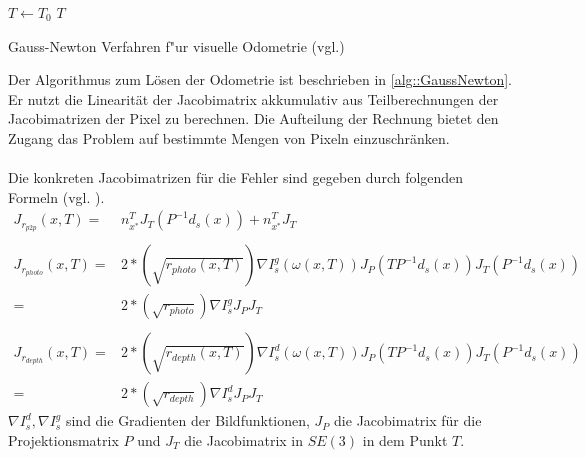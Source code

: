 \documentclass[12pt,DIV=15,BCOR=15mm,twoside,headsepline,abstract=true,listof=totoc,bibliography=totoc]{scrreprt}
\theoremstyle{remark}    %
\begin{document}
    \begin{algorithm}[t]
        \SetAlgoLined
        $T \gets T_0$\;
        \Return $T$\;
        \caption{Gauss-Newton Verfahren f"ur  visuelle Odometrie (vgl.\cite[Kap.8.4]{Absil2008}\cite{Zhou2018,Park_2017_ICCV})}\label{alg::GaussNewton}
    \end{algorithm} \noindent
    Der Algorithmus zum Lösen der Odometrie ist beschrieben in \ref{alg::GaussNewton}. Er nutzt die Linearität der Jacobimatrix akkumulativ aus Teilberechnungen
    der Jacobimatrizen der Pixel zu berechnen. Die Aufteilung der Rechnung bietet den Zugang das Problem auf bestimmte Mengen von Pixeln einzuschränken.\\\\
    Die konkreten Jacobimatrizen für die Fehler sind gegeben durch folgenden Formeln (vgl. \cite[S.146, Fom.28-30]{Park_2017_ICCV}). 
    \begin{align*}
        \label{jacobian}
        J_{r_{p2p}}(x,T)=&n_{x^*}^{T}J_T(P^{-1}d_s(x))+ n_{x^*}^{T}J_T \\\\
        J_{r_{photo}}(x,T)=&2*\left(\sqrt{r_{photo}(x,T)}\right)\nabla I_s^g(\omega(x,T)) J_P(TP^{-1}d_s(x)) J_T(P^{-1}d_s(x))\\
                         =&2*\left(\sqrt{r_{photo}}\right)\nabla I_s^g J_P J_T\\\\
        J_{r_{depth}}(x,T)=&2*\left(\sqrt{r_{depth}(x,T)}\right)\nabla I_s^d(\omega(x,T)) J_P(TP^{-1}d_s(x)) J_T(P^{-1}d_s(x))\\
                        =&2*\left(\sqrt{r_{depth}}\right)\nabla I_s^dJ_PJ_T
    \end{align*}
    $\nabla I_s^d,\nabla I_s^g$ sind die Gradienten der Bildfunktionen, $J_P$ die Jacobimatrix für die Projektionsmatrix $P$ und $J_T$ die Jacobimatrix 
    in $SE(3)$ in dem Punkt $T$.\\\\
\end{document}
